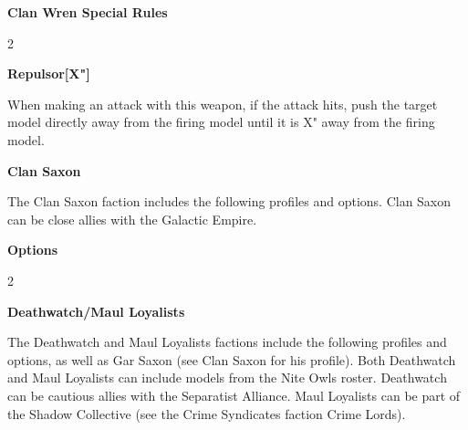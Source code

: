 \documentclass{article}
\begin{document}
{\large \textbf{Clan Wren Special Rules}}
\vspace{0.3cm}
\begin{multicols}{2}
    {\scriptsize

    \begin{minipage}{9cm}
        {\normalsize \textbf{Repulsor[X"]}}
        \vspace{0.3cm}

        When making an attack with this weapon, if the attack hits,
        push the target model directly away from the firing model
        until it is X" away from the firing model.
    \end{minipage}

    }
\end{multicols}

\newpage

{\Large \textbf{Clan Saxon}}
\vspace{0.3cm}

\begin{minipage}{19cm}
    The Clan Saxon faction includes the following profiles and options.
    Clan Saxon can be close allies with the Galactic Empire.
\end{minipage}

\vspace{0.3cm}
{\scriptsize
\setlength\extrarowheight{1.5pt}

}
\vspace{0.6cm}

{\large \textbf{Options}}
\vspace{0.3cm}
\begin{multicols}{2}
    {\scriptsize

    \setlength\extrarowheight{1.5pt}
    

    \vspace{0.6cm}

    \setlength\extrarowheight{1.5pt}
    

    }
\end{multicols}
\vspace{0.6cm}

{\Large \textbf{Deathwatch/Maul Loyalists}}
\vspace{0.3cm}

\begin{minipage}{19cm}
    The Deathwatch and Maul Loyalists factions include the following profiles and
    options, as well as Gar Saxon (see Clan Saxon for his profile).
    Both Deathwatch and Maul Loyalists can include models from the Nite Owls roster.
    Deathwatch can be cautious allies with the Separatist Alliance.
    Maul Loyalists can be part of the Shadow Collective (see the Crime Syndicates faction
    Crime Lords).
\end{minipage}
\end{document}
